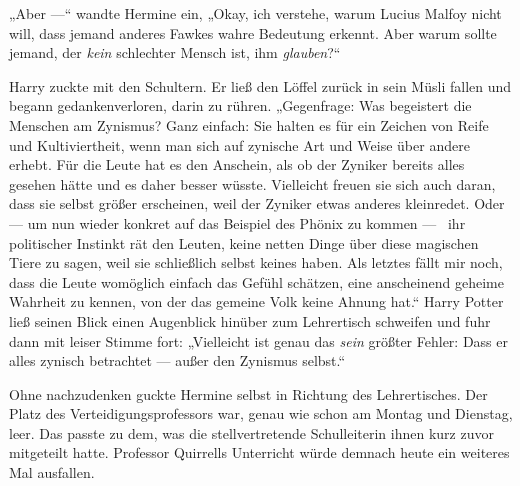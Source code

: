 „Aber —“ wandte Hermine ein,
„Okay, ich verstehe, warum Lucius Malfoy nicht will, dass jemand anderes Fawkes wahre Bedeutung erkennt. Aber warum sollte jemand, der \emph{kein} schlechter Mensch ist, ihm \emph{glauben}?“

Harry zuckte mit den Schultern. Er ließ den Löffel zurück in sein Müsli fallen und begann gedankenverloren, darin zu rühren.
„Gegenfrage: Was begeistert die Menschen am Zynismus? Ganz einfach: Sie halten es für ein Zeichen von Reife und Kultiviertheit, wenn man sich auf zynische Art und Weise über andere erhebt. Für die Leute hat es den Anschein, als ob der Zyniker bereits alles gesehen hätte und es daher besser wüsste. Vielleicht freuen sie sich auch daran, dass sie selbst größer erscheinen, weil der Zyniker etwas anderes kleinredet. Oder — um nun wieder konkret auf das Beispiel des Phönix zu kommen — ~ihr politischer Instinkt rät den Leuten, keine netten Dinge über diese magischen Tiere zu sagen, weil sie schließlich selbst keines haben. Als letztes fällt mir noch, dass die Leute womöglich einfach das Gefühl schätzen, eine anscheinend geheime Wahrheit zu kennen, von der das gemeine Volk keine Ahnung hat.“ Harry Potter ließ seinen Blick einen Augenblick hinüber zum Lehrertisch schweifen und fuhr dann mit leiser Stimme fort:
„Vielleicht ist genau das \emph{sein} größter Fehler: Dass er alles zynisch betrachtet — außer den Zynismus selbst.“

Ohne nachzudenken guckte Hermine selbst in Richtung des Lehrertisches. Der Platz des Verteidigungsprofessors war, genau wie schon am Montag und Dienstag, leer. Das passte zu dem, was die stellvertretende Schulleiterin ihnen kurz zuvor mitgeteilt hatte. Professor Quirrells Unterricht würde demnach heute ein weiteres Mal ausfallen.


